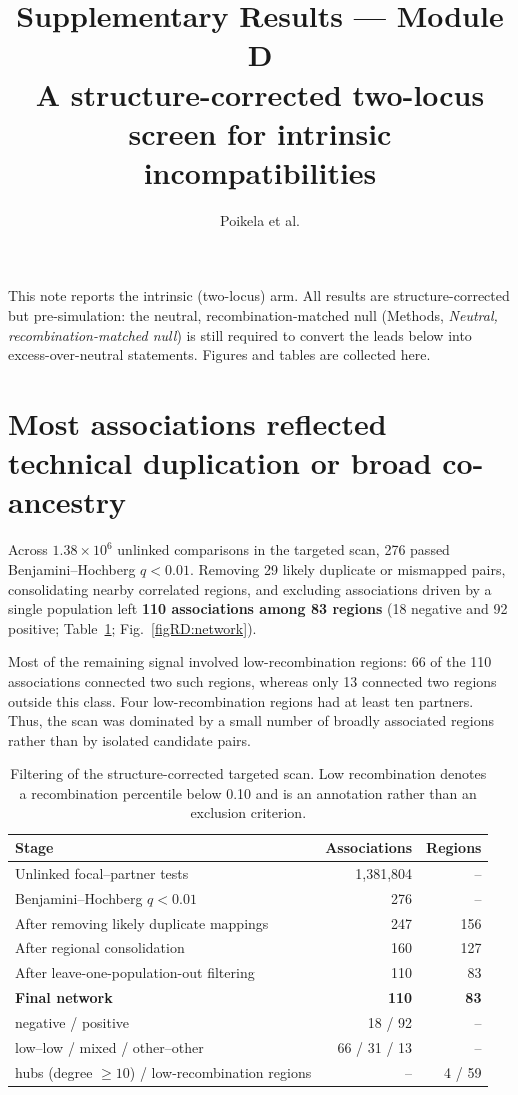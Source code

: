 \documentclass[11pt]{article}
\title{\vspace{-3em}\textbf{\color{Accent}Supplementary Results --- Module D}\\[0.3em]
  \Large A structure-corrected two-locus screen for intrinsic incompatibilities}
\author{Poikela et al.}
\date{}
\begin{document}
\maketitle
\vspace{-1.5em}
\begin{center}\small\color{Muted}
This note reports the intrinsic (two-locus) arm. All results are structure-corrected but
pre-simulation: the neutral, recombination-matched null (Methods, \emph{Neutral,
recombination-matched null}) is still required to convert the leads below into
excess-over-neutral statements. Figures and tables are collected here.
\end{center}

\section{Most associations reflected technical duplication or broad co-ancestry}\label{srD:scan}

Across $1.38\times10^{6}$ unlinked comparisons in the targeted scan, 276 passed
Benjamini--Hochberg $q<0.01$. Removing 29 likely duplicate or mismapped pairs, consolidating
nearby correlated regions, and excluding associations driven by a single population left
\textbf{110 associations among 83 regions} (18 negative and 92 positive;
Table~\ref{tabRD:cascade}; Fig.~\ref{figRD:network}).

Most of the remaining signal involved low-recombination regions: 66 of the 110 associations
connected two such regions, whereas only 13 connected two regions outside this class. Four
low-recombination regions had at least ten partners. Thus, the scan was dominated by a small
number of broadly associated regions rather than by isolated candidate pairs.

\begin{table}[t]
\centering
\caption{Filtering of the structure-corrected targeted scan. Low recombination denotes a
recombination percentile below 0.10 and is an annotation rather than an exclusion criterion.}
\label{tabRD:cascade}
\small
\begin{tabular}{lrr}
\toprule
Stage & Associations & Regions \\
\midrule
Unlinked focal--partner tests & 1{,}381{,}804 & -- \\
Benjamini--Hochberg $q<0.01$ & 276 & -- \\
After removing likely duplicate mappings & 247 & 156 \\
After regional consolidation & 160 & 127 \\
After leave-one-population-out filtering & 110 & 83 \\
\midrule
\textbf{Final network} & \textbf{110} & \textbf{83} \\
\quad negative / positive & 18 / 92 & -- \\
\quad low--low / mixed / other--other & 66 / 31 / 13 & -- \\
\quad hubs (degree $\geq10$) / low-recombination regions & -- & 4 / 59 \\
\bottomrule
\end{tabular}
\end{table}
\end{document}
